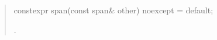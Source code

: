 \documentclass{wg21}
\begin{document}
\begin{quote}
\begin{addedblock}
\begin{itemdecl}
	constexpr span(const span& other) noexcept = default;
\end{itemdecl}
\begin{itemdescr}
	\pnum
	\ensures
	.
\end{itemdescr}
\end{addedblock}


\end{quote}
\end{document}
